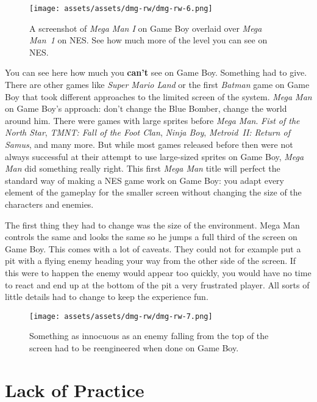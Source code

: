 \documentclass{book}
\begin{document}
\begin{figure}[hbt]
\vskip 10pt
\centering \texttt{[image: assets/assets/dmg-rw/dmg-rw-6.png]}\par\pagetwodescription A screenshot of \emph{Mega Man I} on Game Boy overlaid over \emph{Mega Man 1} on NES. See how much more of the level you can see on NES.
\vskip 6pt
\end{figure}
You can see here how much you \textbf{can’t} see on Game Boy. Something had to give. There are other games like \emph{Super Mario Land} or the first \emph{Batman} game on Game Boy that took different approaches to the limited screen of the system. \emph{Mega Man} on Game Boy’s approach: don’t change the Blue Bomber, change the world around him. There were games with large sprites before \emph{Mega Man}. \emph{Fist of the North Star}, \emph{TMNT: Fall of the Foot Clan}, \emph{Ninja Boy}, \emph{Metroid II: Return of Samus}, and many more. But while most games released before then were not always successful at their attempt to use large-sized sprites on Game Boy, \emph{Mega Man} did something really right. This first \emph{Mega Man} title will perfect the standard way of making a NES game work on Game Boy: you adapt every element of the gameplay for the smaller screen without changing the size of the characters and enemies.

The first thing they had to change was the size of the environment. Mega Man controls the same and looks the same so he jumps a full third of the screen on Game Boy. This comes with a lot of caveats. They could not for example put a pit with a flying enemy heading your way from the other side of the screen. If this were to happen the enemy would appear too quickly, you would have no time to react and end up at the bottom of the pit a very frustrated player. All sorts of little details had to change to keep the experience fun.

\begin{figure}[hbt]
\vskip 10pt
\centering \texttt{[image: assets/assets/dmg-rw/dmg-rw-7.png]}\par\pagetwodescription Something as innocuous as an enemy falling from the top of the screen had to be reengineered when done on Game Boy.
\vskip 6pt
\end{figure}

\FloatBarrier\needspace{5pt}\section*{Lack of Practice}\nopagebreak[4]
\end{document}
